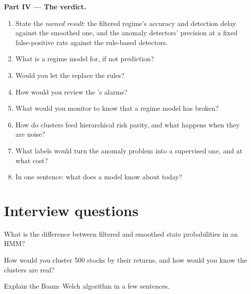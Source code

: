 \begin{problem}
\medskip\noindent\textbf{Part IV --- The verdict.}
\begin{enumerate}[resume]
\item State the \emph{named result}: the filtered regime's accuracy and detection delay against the smoothed one, and the anomaly
detectors' precision at a fixed false-positive rate against the rule-based detectors.
\item What is a regime model for, if not prediction?
\item Would you let the  replace the rules?
\item How would you review the 's alarms?
\item What would you monitor to know that a regime model has broken?
\item How do clusters feed hierarchical risk parity, and what happens when they are noise?
\item What labels would turn the anomaly problem into a supervised one, and at what cost?
\item In one sentence: what does a model know about today?
\end{enumerate}
\end{problem}

\section{Interview questions}

\begin{interviewq}\label{iq:ml:clustering-regimes-and-anomaly-detection:1}
What is the difference between filtered and smoothed state probabilities in an HMM?
\end{interviewq}

\begin{interviewq}\label{iq:ml:clustering-regimes-and-anomaly-detection:2}
How would you cluster 500 stocks by their returns, and how would you know the clusters are real?
\end{interviewq}

\begin{interviewq}\label{iq:ml:clustering-regimes-and-anomaly-detection:3}
Explain the Baum--Welch algorithm in a few sentences.
\end{interviewq}

